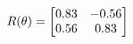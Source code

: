 \documentclass[preview]{standalone}
\begin{document}
\begin{align*}
\special{dvisvgm:raw <g id='unique000'>}R(\theta) = \begin{bmatrix}0.83 & -0.56\\0.56 & 0.83\end{bmatrix}\special{dvisvgm:raw </g>}
\end{align*}
\end{document}
